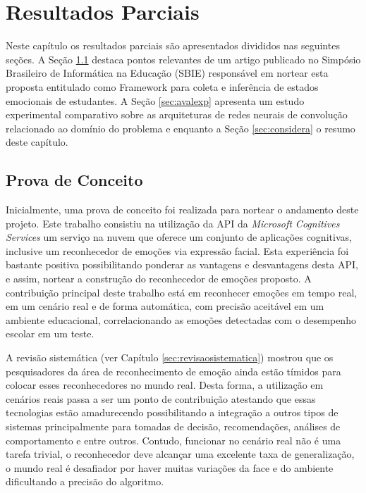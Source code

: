 \chapter{Resultados Parciais}\label{sec:resultados}
Neste capítulo os resultados parciais são apresentados divididos nas seguintes seções. A Seção \ref{sec:prova} destaca pontos relevantes de um artigo publicado no Simpósio Brasileiro de Informática na Educação (SBIE) responsável em nortear esta proposta entitulado como Framework para coleta e inferência de estados emocionais de estudantes. A Seção \ref{sec:avalexp} apresenta um estudo experimental comparativo sobre as arquiteturas de redes neurais de convolução relacionado ao domínio do problema e enquanto a Seção \ref{sec:considera} o resumo deste capítulo.   


\section{Prova de Conceito}\label{sec:prova}
Inicialmente, uma prova de conceito foi realizada para nortear o andamento deste projeto. Este trabalho \citep{cruz2017framework} consistiu na utilização da API da \textit{Microsoft Cognitives Services} um serviço na nuvem que oferece um conjunto de aplicações cognitivas, inclusive um reconhecedor de emoções via expressão facial. Esta experiência foi bastante positiva possibilitando ponderar as vantagens e desvantagens desta API, e assim, nortear a construção do reconhecedor de emoções proposto. A contribuição principal deste trabalho está em reconhecer emoções em tempo real, em um cenário real e de forma automática, com precisão aceitável em um ambiente educacional, correlacionando as emoções detectadas com o desempenho escolar em um teste. 

A revisão sistemática (ver Capítulo \ref{sec:revisaosistematica}) mostrou que os pesquisadores da área de reconhecimento de emoção ainda estão tímidos para colocar esses reconhecedores no mundo real. Desta forma, a utilização em cenários reais passa a ser um ponto de contribuição atestando que essas tecnologias estão amadurecendo possibilitando a integração a outros tipos de sistemas principalmente para tomadas de decisão, recomendações, análises de comportamento e entre outros. Contudo, funcionar no cenário real não é uma tarefa trivial, o reconhecedor deve alcançar uma excelente taxa de generalização, o mundo real é desafiador por haver muitas variações da face e do ambiente dificultando a precisão do algoritmo.  

